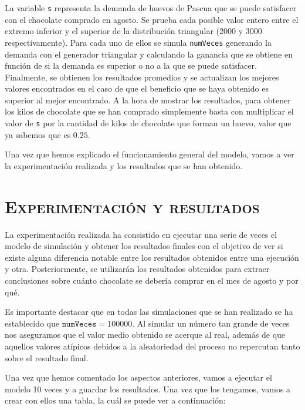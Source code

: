 \documentclass[11pt,a4paper]{article}
\begin{document}
La variable \texttt{s} representa la demanda de huevos de Pascua que se puede satisfacer con el chocolate
comprado en agosto. Se prueba cada posible valor entero entre el extremo inferior y el superior de la distribución
triangular (2000 y 3000 respectivamente). Para cada uno de ellos se simula \texttt{numVeces} generando la demanda
con el generador triangular y calculando la ganancia que se obtiene en función de si la demanda es
superior o no a la que se puede satisfacer. Finalmente, se obtienen los resultados promedios y se actualizan
los mejores valores encontrados en el caso de que el beneficio que se haya obtenido es superior al mejor
encontrado. A la hora de mostrar los resultados, para obtener los kilos de chocolate que se han comprado
simplemente basta con multiplicar el valor de \texttt{s} por la cantidad de kilos de chocolate que forman un
huevo, valor que ya sabemos que es $0.25$.

Una vez que hemos explicado el funcionamiento general del modelo, vamos a ver la experimentación
realizada y los resultados que se han obtenido.

\section{\textsc{Experimentación y resultados}}

La experimentación realizada ha consistido en ejecutar una serie de veces el modelo de simulación
y obtener los resultados finales con el objetivo de ver si existe alguna diferencia notable entre los
resultados obtenidos entre una ejecución y otra. Posteriormente, se utilizarán los resultados obtenidos
para extraer conclusiones sobre cuánto chocolate se debería comprar en el mes de agosto y por qué.

Es importante destacar que en todas las simulaciones que se han realizado
se ha establecido que $\texttt{numVeces} = 100000$. Al simular un número tan grande de veces nos
aseguramos que el valor medio obtenido se acerque al real, además de que aquellos valores atípicos
debidos a la aleatoriedad del proceso no repercutan tanto sobre el resultado final.

Una vez que hemos comentado los aspectos anteriores, vamos a ejecutar el modelo 10 veces y a guardar
los resultados. Una vez que los tengamos, vamos a crear con ellos una tabla, la cuál se puede ver
a continuación:
\end{document}
